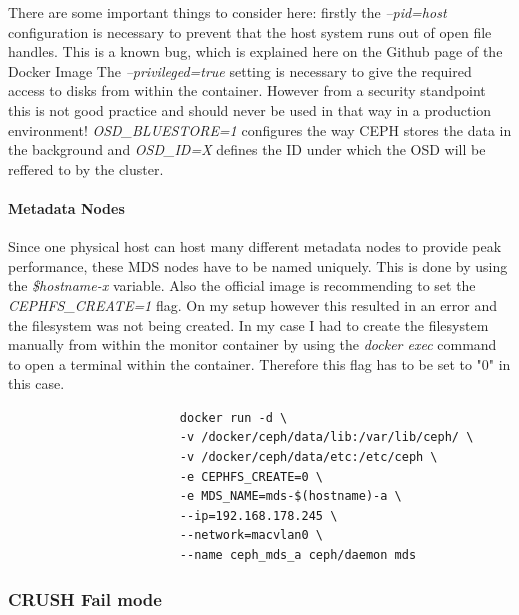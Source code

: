 \documentclass[titlepage, a4paper, 11pt]{scrartcl}
\begin{document}
                    There are some important things to consider here: firstly the \textit{--pid=host} configuration is  necessary to prevent that the host system
                    runs out of open file handles. This is a known bug, which is explained here on the Github page of the Docker Image %
                    The \textit{--privileged=true} setting is  necessary to give the required access to disks from within the container. However from a security standpoint this is not good practice and should never be used in that way in a production environment! \textit{OSD\_BLUESTORE=1} configures the way CEPH stores the data in the background and \textit{OSD\_ID=X} defines the ID under which the OSD will be reffered to by the cluster.

                \paragraph{Metadata Nodes}

                    Since one physical host can host many different metadata nodes to provide peak performance, these MDS nodes have to be named uniquely. This is done 
                    by using the \textit{\$hostname-x} variable. Also the official image is recommending to set the \textit{CEPHFS\_CREATE=1} flag. On my setup however this resulted in an error and the filesystem was not being created. In my case I had to create the filesystem manually from within the monitor container by using the \textit{docker exec} command to open a terminal within the container. Therefore this flag has to be set to "0" in this case.

                    \begin{lstlisting}
                        docker run -d \
                        -v /docker/ceph/data/lib:/var/lib/ceph/ \
                        -v /docker/ceph/data/etc:/etc/ceph \
                        -e CEPHFS_CREATE=0 \
                        -e MDS_NAME=mds-$(hostname)-a \
                        --ip=192.168.178.245 \
                        --network=macvlan0 \
                        --name ceph_mds_a ceph/daemon mds
                    \end{lstlisting}   
                    
            \subsubsection{CRUSH Fail mode}\label{system:crush-fail}
\end{document}
